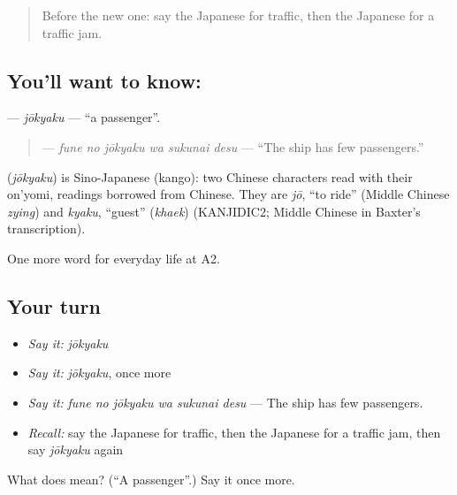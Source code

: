 \begin{quote}
Before the new one: say the Japanese for traffic, then the Japanese for a traffic jam.
\end{quote}

\subsection*{You'll want to know: }
\textbf{} — \emph{jōkyaku} — \textquotedblleft{}a passenger\textquotedblright{}.

\begin{quote}
\textbf{  } — \emph{fune no jōkyaku wa sukunai desu} — \textquotedblleft{}The ship has few passengers.\textquotedblright{}
\end{quote}

\begin{cousinweb}
\textbf{} (\emph{jōkyaku}) is Sino-Japanese (kango): two Chinese characters read with their on'yomi, readings borrowed from Chinese. They are \emph{jō}, \textquotedblleft{}to ride\textquotedblright{} (Middle Chinese \emph{zying}) and \emph{kyaku}, \textquotedblleft{}guest\textquotedblright{} (\emph{khaek}) (KANJIDIC2; Middle Chinese in Baxter's transcription).
\end{cousinweb}

\begin{grammarlens}[title={What you've built}]
One more word for everyday life at A2.
\end{grammarlens}

\subsection*{Your turn}
\begin{itemize}
\raggedright
  \item \emph{Say it:} \emph{jōkyaku}
  \item \emph{Say it:} \emph{jōkyaku}, once more
  \item \emph{Say it:} \emph{fune no jōkyaku wa sukunai desu} — The ship has few passengers.
  \item \emph{Recall:} say the Japanese for traffic, then the Japanese for a traffic jam, then say \emph{jōkyaku} again
\end{itemize}

\begin{tcolorbox}[breakable,colback=teal!4,colframe=teal!35!black,title={Before you move on}]
What does  mean? (\textquotedblleft{}A passenger\textquotedblright{}.) Say it once more.
\end{tcolorbox}
